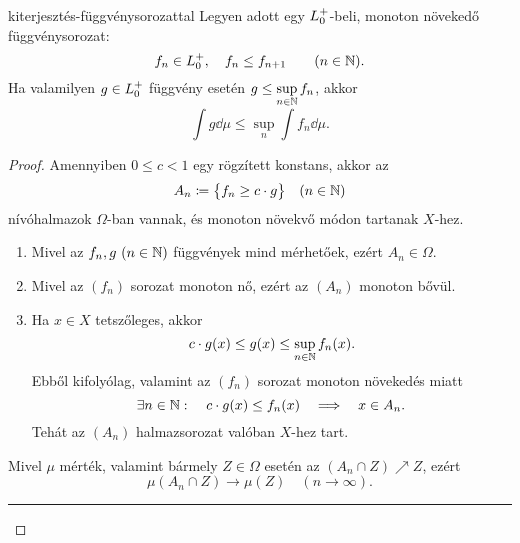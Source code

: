 \documentclass[
]{elteikthesis}[2024/04/26]
\begin{document}
	\begin{theorem}{}{kiterjesztés-függvénysorozattal}
		Legyen adott egy \( \StepFuncPos \)-beli, monoton növekedő függvénysorozat:
		\[
			f_n \in \StepFuncPos, \quad f_n \leq f_{n + 1} \qquad (n \in \N).
		\]
		Ha valamilyen \( g \in \StepFuncPos \) függvény
		esetén \( g \leq \sup\limits_{n \in \mathbb{N}} f_n \), akkor
		\[
			\int g \dd{\mu} \leq \sup_{n} \int f_n \dd{\mu}.
		\]
	\end{theorem}
	\begin{proof}
		Amennyiben \( 0 \leq c < 1 \) egy rögzített konstans, akkor az
		\[
			A_n \coloneq \bigl\{ f_n \geq c \cdot g \bigr\} \quad (n \in \mathbb{N})
		\]
		nívóhalmazok \( \Omega \)-ban vannak, és monoton növekvő módon tartanak \( X \)-hez.
		
		\begin{enumerate}
			\item
			Mivel az \( f_n, g \ (n \in \mathbb{N}) \) függvények mind mérhetőek, ezért \( A_n \in \Omega \). \checkmark
			
			\item 
			Mivel az \( (f_n) \) sorozat monoton nő, ezért az \( (A_n) \) monoton bővül. \checkmark
			
			\item Ha \( x \in X \) tetszőleges, akkor
			\[
				c \cdot g(x) \leq g(x) \leq \sup_{n \in \mathbb{N}} f_n(x).
			\]
			Ebből kifolyólag, valamint az \( (f_n) \) sorozat monoton növekedés miatt
			\[
				\exists n \in \mathbb{N} \, \colon \quad
				c \cdot g(x) \leq f_n(x)
				\quad \Longrightarrow \quad
				x \in A_n.
			\]
			Tehát az \( (A_n) \) halmazsorozat valóban \( X \)-hez tart. \checkmark
		\end{enumerate}
		
		Mivel \( \mu \) mérték, valamint bármely \( Z \in \Omega \) esetén 
		az \( (A_n \cap Z) \nearrow Z \), ezért
		\begin{equation}\label{eq:majoráló-lépcsősfüggvény-sorozat}
			\mu(A_n \cap Z) \longrightarrow \mu(Z) \quad (n \to \infty). \tag{\( * \)}
		\end{equation}
		
		\vspace{6pt}
		\hrule
		\vspace{9pt}
		

\end{proof}
\end{document}
